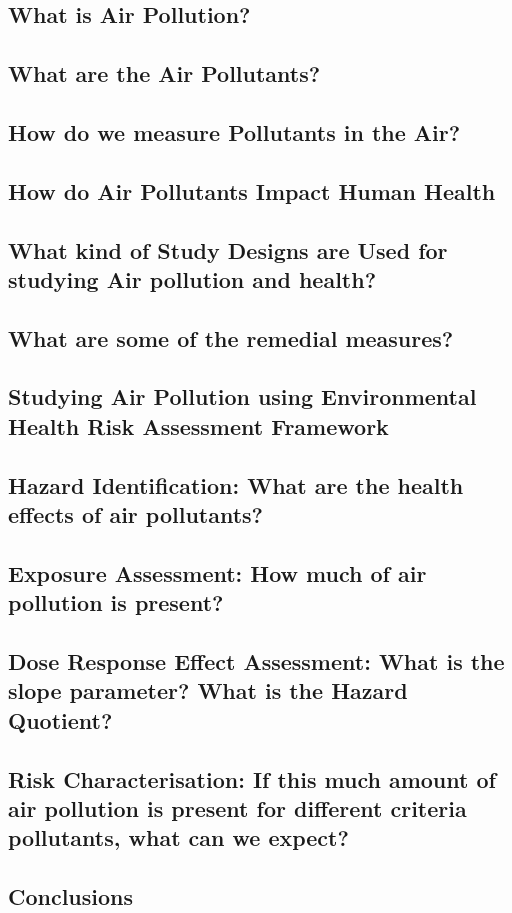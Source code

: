 \subsection{What is Air Pollution?}

\subsection{What are the Air Pollutants?}

\subsection{How do we measure Pollutants in the Air?}

\subsection{How do Air Pollutants Impact Human Health}

\subsection{What kind of Study Designs are Used for studying Air pollution and health?}

\subsection{What are some of the remedial measures?}

\subsection{Studying Air Pollution using Environmental Health Risk Assessment Framework}

\subsection{Hazard Identification: What are the health effects of air pollutants?}

\subsection{Exposure Assessment: How much of air pollution is present?}

\subsection{Dose Response Effect Assessment: What is the slope parameter? What is the Hazard Quotient?}

\subsection{Risk Characterisation: If this much amount of air pollution is present for different criteria pollutants, what can we expect?}

\subsection{Conclusions}